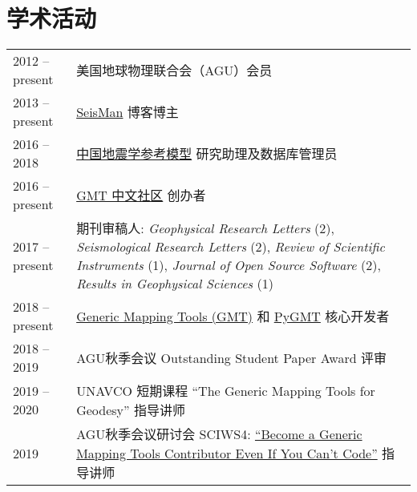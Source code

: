 \section*{学术活动}

\newcommand{\tabitem}{~~\llap{\textbullet}~~}

\begin{tabular}{p{} p{}}
2012 -- present & 美国地球物理联合会（AGU）会员 \\
2013 -- present & \href{https://blog.seisman.info}{SeisMan} 博客博主 \\
2016 -- 2018    & \href{http://chinageorefmodel.org/}{中国地震学参考模型} 研究助理及数据库管理员 \\
2016 -- present & \href{http://gmt-china.org/}{GMT 中文社区} 创办者 \\
2017 -- present & 期刊审稿人:
                  \textit{Geophysical Research Letters} (2),
                  \textit{Seismological Research Letters} (2),
                  \textit{Review of Scientific Instruments} (1),
                  \textit{Journal of Open Source Software} (2),
                  \textit{Results in Geophysical Sciences} (1) \\
2018 -- present & \href{https://github.com/GenericMappingTools/gmt}{Generic Mapping Tools (GMT)} 和 \href{https://github.com/GenericMappingTools/pygmt}{PyGMT} 核心开发者 \\
2018 -- 2019 & AGU秋季会议 Outstanding Student Paper Award 评审 \\
2019 -- 2020 & UNAVCO 短期课程 ``The Generic Mapping Tools for Geodesy'' 指导讲师 \\
2019 & AGU秋季会议研讨会 SCIWS4: \href{https://www.agu.org/Events/SCIWS4-Generic-Mapping-Tools}{``Become a Generic Mapping Tools Contributor Even If You Can't Code''} 指导讲师 \\
\end{tabular}
